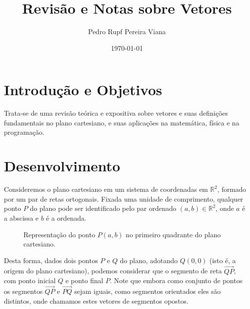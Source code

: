 \documentclass[a4paper,12pt]{article}
\title{Revisão e Notas sobre Vetores}
\author{Pedro Rupf Pereira Viana}
\date{\today}
\numberwithin{equation}{section}
\begin{document}
\maketitle
\newpage

\section{Introdução e Objetivos}
Trata-se de uma revisão teórica e expositiva sobre vetores e suas definições fundamentais no plano cartesiano, e suas aplicações na matemática, física e na programação.

\section{Desenvolvimento}

Consideremos o plano cartesiano em um sistema de coordenadas em $\mathbb{R}^{2}$, formado por um par de retas ortogonais. Fixada uma unidade de comprimento, 
qualquer ponto $P$ do plano pode ser identificado pelo par ordenado $(a,b) \in \mathbb{R}^2$, onde $a$ é a abscissa e $b$ é a ordenada.

\begin{figure}[h]
\centering
{}
\caption{Representação do ponto $P(a,b)$ no primeiro quadrante do plano cartesiano.}
\label{fig:ponto_P}
\end{figure}

Desta forma, dados dois pontos $P$ e $Q$ do plano, adotando $Q(0,0)$ (isto é, a origem do plano cartesiano), podemos considerar que o segmento de reta 
$\overrightarrow{QP}$, com ponto inicial $Q$ e ponto final $P$. Note que embora como conjunto de pontos os segmentos $\overrightarrow{QP}$ e $\overrightarrow{PQ}$ 
sejam iguais, como segmentos orientados eles são distintos, onde chamamos estes vetores de segmentos opostos.
\end{document}
